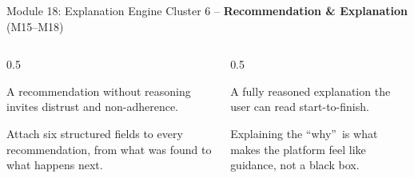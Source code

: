 \documentclass[9pt,aspectratio=169]{beamer}
\begin{document}
\begin{frame}{Module 18: Explanation Engine}
\textcolor{black!55}{\scriptsize Cluster 6 -- \textcolor{green!60!black}{\textbf{Recommendation \& Explanation}} (M15--M18)}\\[2pt]
\begin{columns}[T,onlytextwidth]
\begin{column}{0.5\textwidth}
\begin{tcolorbox}[colback=blue!7,colframe=blue!55!black,title=\textbf{Motivation},boxrule=0.6pt,arc=1mm,left=5pt,right=5pt,top=3pt,bottom=3pt,fonttitle=\small]
\footnotesize A recommendation without reasoning invites distrust and non-adherence.
\end{tcolorbox}
\vspace{5pt}
\begin{tcolorbox}[colback=teal!7,colframe=teal!55!black,title=\textbf{Method},boxrule=0.6pt,arc=1mm,left=5pt,right=5pt,top=3pt,bottom=3pt,fonttitle=\small]
\footnotesize Attach six structured fields to every recommendation, from what was found to what happens next.
\end{tcolorbox}
\end{column}
\begin{column}{0.5\textwidth}
\begin{tcolorbox}[colback=green!8,colframe=green!45!black,title=\textbf{Result},boxrule=0.6pt,arc=1mm,left=5pt,right=5pt,top=3pt,bottom=3pt,fonttitle=\small]
\footnotesize A fully reasoned explanation the user can read start-to-finish.
\end{tcolorbox}
\vspace{5pt}
\begin{tcolorbox}[colback=orange!10,colframe=orange!65!black,title=\textbf{Conclusion},boxrule=0.6pt,arc=1mm,left=5pt,right=5pt,top=3pt,bottom=3pt,fonttitle=\small]
\footnotesize Explaining the \textquotedblleft why\textquotedblright\ is what makes the platform feel like guidance, not a black box.
\end{tcolorbox}
\end{column}
\end{columns}
\end{frame}
\end{document}
